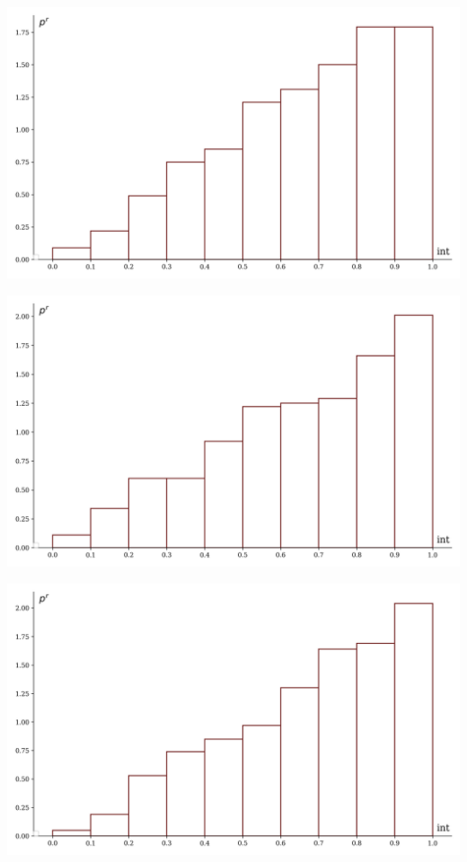 \documentclass[a4paper, 14pt]{extarticle}
\begin{document}
\begin{minipage}[t]{0.25\textwidth}
\includegraphics[width=\textwidth, height=\textheight, keepaspectratio]{sample29_hist}
\end{minipage}%
\begin{minipage}[t]{0.25\textwidth}
\includegraphics[width=\textwidth, height=\textheight, keepaspectratio]{sample30_hist}
\end{minipage}%
\begin{minipage}[t]{0.25\textwidth}
\includegraphics[width=\textwidth, height=\textheight, keepaspectratio]{sample31_hist}
\end{minipage}%
\end{document}

